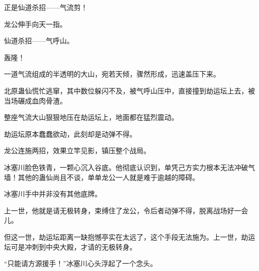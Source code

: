\begin{this_body}
正是仙道杀招——气流剪！

龙公伸手向天一指。

仙道杀招——气呼山。

轰隆！

一道气流组成的半透明的大山，宛若天倾，骤然形成，迅速盖压下来。

北原蛊仙慌忙逃窜，其中数位躲闪不及，被气呼山压中，直接撞到劫运坛上去，被当场碾成血肉骨渣。

整座气流大山狠狠地压在劫运坛上，地面都在猛烈震动。

劫运坛原本蠢蠢欲动，此刻却是动弹不得。

龙公连施两招，效果立竿见影，镇压整个战局。

冰塞川脸色铁青，一颗心沉入谷底。他彻底认识到，单凭己方实力根本无法冲破气墙！其他的蛊仙尚且不谈，单单龙公一人就是难于逾越的障碍。

冰塞川手中并非没有其他底牌。

上一世，他就是请无极转身，束缚住了龙公，令后者动弹不得，脱离战场好一会儿。

但这一世，劫运坛距离一缺抱憾亭实在太远了，这个手段无法施为。上一世，劫运坛可是冲刺到中央大殿，才请的无极转身。

“只能请方源援手！”冰塞川心头浮起了一个念头。

\end{this_body}

